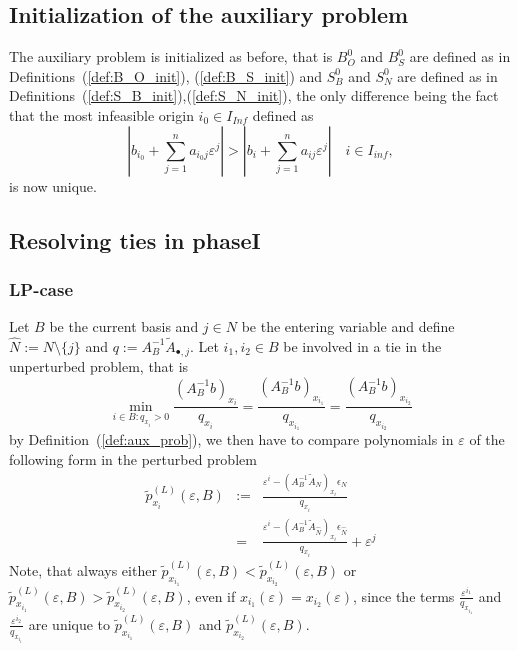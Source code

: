\documentclass[a4paper]{article}
\begin{document}
\subsection{Initialization of the auxiliary problem}
The auxiliary problem is initialized as before, that is $B_{O}^{0}$ and
$B_{S}^{0}$ are defined as in Definitions~(\ref{def:B_O_init}),
(\ref{def:B_S_init}) and $S_{B}^{0}$ and $S_{N}^{0}$ are defined as in
Definitions~(\ref{def:S_B_init}),(\ref{def:S_N_init}), the only difference being
the fact that the most infeasible origin $i_{0} \in I_{Inf}$ defined as
\begin{equation*}
  \left|b_{i_{0}} + \sum_{j=1}^{n}a_{i_{0}j}\varepsilon^{j} \right|
    >
    \left|b_{i} + \sum_{j=1}^{n}a_{ij}\varepsilon^{j} \right|
    \quad i \in I_{inf},
\end{equation*}
is now unique.

\subsection{Resolving ties in phaseI}
\label{sec:Res_ties_phaseI}
\subsubsection{LP-case}
Let $B$ be the current basis and $j \in N$ be the entering variable
and define $\hat{N}:= N \setminus\{j\}$ and
$q:= A_{B}^{-1}\tilde{A}_{\bullet,j}$.
Let $i_{1}, i_{2} \in B$ be
involved in a tie in the unperturbed problem, that is
\begin{equation*}
  \min_{i \in B: q_{x_{i}} > 0}
  \frac{\left(A_{B}^{-1}b\right)_{x_{i}}}{q_{x_{i}}}
  =
  \frac{\left(A_{B}^{-1}b\right)_{x_{i_{1}}}}{q_{x_{i_{1}}}}
  =
  \frac{\left(A_{B}^{-1}b\right)_{x_{i_{2}}}}{q_{x_{i_{2}}}}
\end{equation*}
by Definition~(\ref{def:aux_prob}),  we then have to compare
polynomials in $\varepsilon$ of the following form in the perturbed problem
\begin{eqnarray}
\tilde{p}_{x_{i}}^{(L)}\left(\varepsilon, B\right) & := &
  \frac{\varepsilon^{i}
  - \left(A_{B}^{-1}\tilde{A}_{N}\right)_{x_{i}}
  \epsilon_{N}}{q_{x_{i}}} \nonumber \\
\label{def:p_x_i_tilde}
 & = &
  \frac{\varepsilon^{i}
  - \left(A_{B}^{-1}\tilde{A}_{\hat{N}}\right)_{x_{i}}
  \epsilon_{\hat{N}}}{q_{x_{i}}}
  + \varepsilon^{j}
\end{eqnarray}
Note, that always either $\tilde{p}_{x_{i_{1}}}^{(L)}
\left(\varepsilon, B\right) <
\tilde{p}_{x_{i_{2}}}^{(L)}\left(\varepsilon, B\right)$ or
$\tilde{p}_{x_{i_{1}}}^{(L)}\left(\varepsilon, B\right) >
\tilde{p}_{x_{i_{2}}}^{(L)}\left(\varepsilon, B\right)$, even if
$x_{i_{1}}(\varepsilon) = x_{i_{2}}(\varepsilon)$,
since the terms $\frac{\varepsilon^{i_{1}}}{q_{x_{i_{1}}}}$ and
$\frac{\varepsilon^{i_{2}}}{q_{x_{i_{1}}}}$ are unique to
$\tilde{p}_{x_{i_{1}}}^{(L)}\left(\varepsilon, B\right)$ and
$\tilde{p}_{x_{i_{2}}}^{(L)}\left(\varepsilon, B\right)$. 
\end{document}
